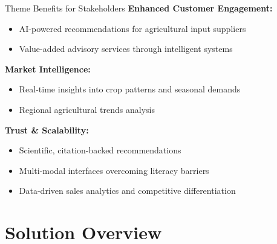 \documentclass[aspectratio=169]{beamer}
\begin{document}
\begin{frame}{Theme Benefits for Stakeholders}
\textbf{Enhanced Customer Engagement:}
\begin{itemize}
\item AI-powered recommendations for agricultural input suppliers
\item Value-added advisory services through intelligent systems
\end{itemize}

\textbf{Market Intelligence:}
\begin{itemize}
\item Real-time insights into crop patterns and seasonal demands
\item Regional agricultural trends analysis
\end{itemize}

\textbf{Trust \& Scalability:}
\begin{itemize}
\item Scientific, citation-backed recommendations
\item Multi-modal interfaces overcoming literacy barriers
\item Data-driven sales analytics and competitive differentiation
\end{itemize}
\end{frame}

\section{Solution Overview}
\end{document}
